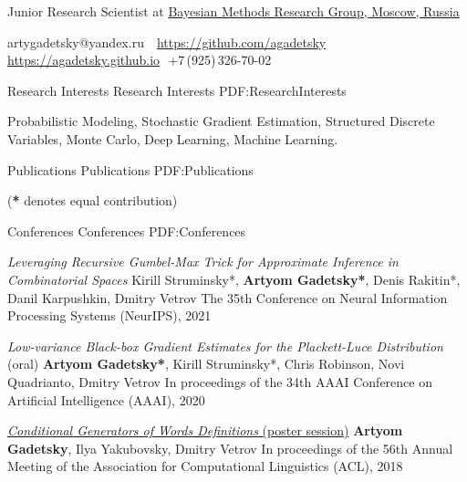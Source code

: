 \documentclass[letterpaper,MMMyyyy,nonstopmode]{simpleresumecv}
\newcommand{\CVAuthor}{Artyom Gadetsky}
\begin{document}

\Title{\CVAuthor}

\begin{SubTitle}
Junior Research Scientist at \href{http://bayesgroup.ru}{Bayesian Methods Research Group, Moscow, Russia}
\par
artygadetsky@yandex.ru
\,\SubBulletSymbol\,
\href{https://github.com/agadetsky}{https://github.com/agadetsky}
\,\SubBulletSymbol\,\href{https://agadetsky.github.io}{https://agadetsky.github.io}\,\SubBulletSymbol\,
+7\,(925)\,326-70-02
\end{SubTitle}

\begin{Body}



\Section
{Research Interests}
{Research Interests}
{PDF:ResearchInterests}

\Item Probabilistic Modeling, Stochastic Gradient Estimation, Structured Discrete Variables, Monte Carlo, Deep Learning, Machine Learning.

\BigGap


\Section
{Publications}
{Publications}
{PDF:Publications}

\Entry
\hfill
(\textbf{*} denotes equal contribution)

\SubSection
{Conferences}
{Conferences}
{PDF:Conferences}

\Item
\textit{Leveraging Recursive Gumbel-Max Trick for Approximate Inference in Combinatorial Spaces}
\Item
Kirill Struminsky*, \textbf{Artyom Gadetsky*}, Denis Rakitin*, Danil Karpushkin, Dmitry Vetrov
\Item
The 35th Conference on Neural Information Processing Systems (NeurIPS), 2021

\Gap
\Item
\textit{Low-variance Black-box Gradient Estimates for the Plackett-Luce Distribution} (oral)
\Item
\textbf{Artyom Gadetsky*}, Kirill Struminsky*, Chris Robinson, Novi Quadrianto, Dmitry Vetrov
\Item
In proceedings of the 34th AAAI Conference on Artificial Intelligence (AAAI), 2020

\Gap
\Item
\href{https://aclanthology.info/papers/P18-2043/p18-2043}{\textit{Conditional Generators of Words Definitions} (poster session)}
\Item
\textbf{Artyom Gadetsky}, Ilya Yakubovsky, Dmitry Vetrov
\Item
In proceedings of the 56th Annual Meeting of the \newline
Association for Computational Linguistics (ACL), 2018


\end{Body}
\end{document}
